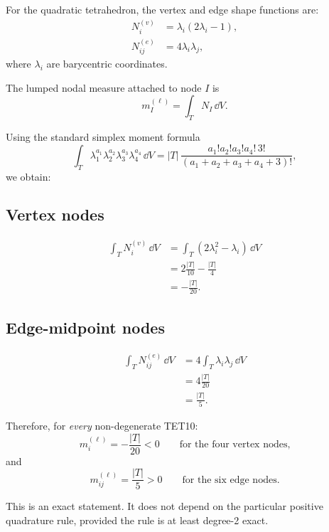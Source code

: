 For the quadratic tetrahedron, the vertex and edge shape functions are:
\begin{align}
  N_i^{(v)} &= \lambda_i(2\lambda_i - 1), \\
  N_{ij}^{(e)} &= 4\lambda_i\lambda_j,
\end{align}
where $\lambda_i$ are barycentric coordinates.

The lumped nodal measure attached to node $I$ is
\begin{equation}
  m_I^{(\ell)} = \int_T N_I \,\dd V.
\end{equation}

Using the standard simplex moment formula
\begin{equation}
  \int_T \lambda_1^{a_1}\lambda_2^{a_2}\lambda_3^{a_3}\lambda_4^{a_4}\,\dd V
  = |T|\,
    \frac{a_1!a_2!a_3!a_4! \, 3!}
         {(a_1+a_2+a_3+a_4+3)!},
\end{equation}
we obtain:

\subsection{Vertex nodes}
\begin{align}
  \int_T N_i^{(v)}\,\dd V
  &= \int_T \left( 2\lambda_i^2 - \lambda_i \right)\,\dd V \\
  &= 2\frac{|T|}{10} - \frac{|T|}{4} \\
  &= -\frac{|T|}{20}.
\end{align}

\subsection{Edge-midpoint nodes}
\begin{align}
  \int_T N_{ij}^{(e)}\,\dd V
  &= 4 \int_T \lambda_i\lambda_j \,\dd V \\
  &= 4\frac{|T|}{20} \\
  &= \frac{|T|}{5}.
\end{align}

Therefore, for \emph{every} non-degenerate TET10:
\begin{equation}
  m_i^{(\ell)} = -\frac{|T|}{20} < 0
  \qquad \text{for the four vertex nodes,}
\end{equation}
and
\begin{equation}
  m_{ij}^{(\ell)} = \frac{|T|}{5} > 0
  \qquad \text{for the six edge nodes.}
\end{equation}

This is an exact statement.  It does not depend on the particular positive
quadrature rule, provided the rule is at least degree-2 exact.


